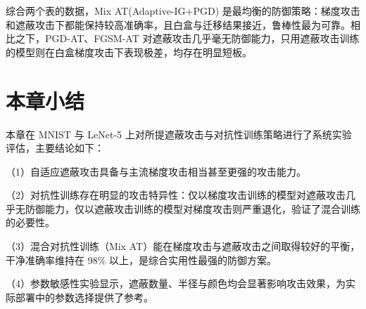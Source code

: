 综合两个表的数据，Mix AT(Adaptive-IG+PGD) 是最均衡的防御策略：梯度攻击和遮蔽攻击下都能保持较高准确率，且白盒与迁移结果接近，鲁棒性最为可靠。相比之下，PGD-AT、FGSM-AT 对遮蔽攻击几乎毫无防御能力，只用遮蔽攻击训练的模型则在白盒梯度攻击下表现极差，均存在明显短板。



\section{本章小结}

本章在 MNIST 与 LeNet-5 上对所提遮蔽攻击与对抗性训练策略进行了系统实验评估，主要结论如下：

（1）自适应遮蔽攻击具备与主流梯度攻击相当甚至更强的攻击能力。

（2）对抗性训练存在明显的攻击特异性：仅以梯度攻击训练的模型对遮蔽攻击几乎无防御能力，仅以遮蔽攻击训练的模型对梯度攻击则严重退化，验证了混合训练的必要性。

（3）混合对抗性训练（Mix AT）能在梯度攻击与遮蔽攻击之间取得较好的平衡，干净准确率维持在 98\% 以上，是综合实用性最强的防御方案。

（4）参数敏感性实验显示，遮蔽数量、半径与颜色均会显著影响攻击效果，为实际部署中的参数选择提供了参考。


